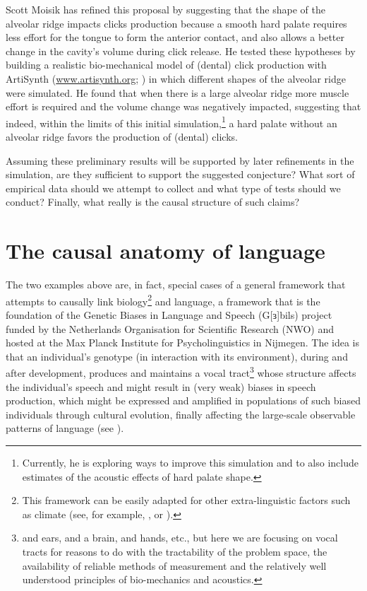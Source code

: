 \documentclass[output=paper]{langsci/langscibook}
\begin{document}
Scott Moisik \citep{MoisikEtAl2015} has refined this proposal by suggesting that the shape of the alveolar ridge impacts clicks production because a smooth hard palate requires less effort for the tongue to form the anterior contact, and also allows a better change in the cavity's volume during click release. He tested these hypotheses by building a realistic bio-mechanical model of (dental) click production with ArtiSynth (\href{http://www.artisynth.org/}{{www.artisynth.org}}; \citealt{Lloyd2012}) in which different shapes of the alveolar ridge were simulated. He found that when there is a large alveolar ridge more muscle effort is required and the volume change was negatively impacted, suggesting that indeed, within the limits of this initial simulation,\footnote{Currently, he is exploring ways to improve this simulation and to also include estimates of the acoustic effects of hard palate shape.} a hard palate without an alveolar ridge favors the production of (dental) clicks.  

Assuming these preliminary results will be supported by later refinements in the simulation, are they sufficient to support the suggested conjecture? What sort of empirical data should we attempt to collect and what type of tests should we conduct? Finally, what really is the causal structure of such claims?

\section{The causal anatomy of language}
  
The two examples above are, in fact, special cases of a general framework that attempts to causally link biology\footnote{This framework can be easily adapted for other extra-linguistic factors such as climate (see, for example, \citealt{Everett2015}, or \citealt{LaddEtAl2015}).} and language, a framework that is the foundation of the Genetic Biases in Language and Speech (G[ɜ]bils) project funded by the Netherlands Organisation for Scientific Research (NWO) and hosted at the Max Planck Institute for Psycholinguistics in Nijmegen. The idea is that an individual's genotype (in interaction with its environment), during and after development, produces and maintains a vocal tract\footnote{and ears, and a brain, and hands, etc., but here we are focusing on vocal tracts for reasons to do with the tractability of the problem space, the availability of reliable methods of measurement and the relatively well understood principles of bio-mechanics and acoustics.} whose structure affects the individual's speech and might result in (very weak) biases in speech production, which might be expressed and amplified in populations of such biased individuals through cultural evolution, finally affecting the large-scale observable patterns of language (see ).
\end{document}
